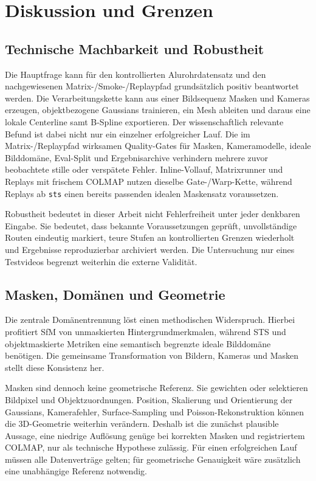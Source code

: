\section{Diskussion und Grenzen}

\subsection{Technische Machbarkeit und Robustheit}

Die Hauptfrage kann für den kontrollierten Alurohrdatensatz und den
nachgewiesenen Matrix-/Smoke-/Replaypfad grundsätzlich positiv beantwortet
werden. Die Verarbeitungskette kann aus einer Bildsequenz Masken und Kameras
erzeugen, objektbezogene Gaussians trainieren, ein Mesh ableiten und daraus
eine lokale Centerline samt B-Spline exportieren. Der wissenschaftlich
relevante Befund ist dabei nicht nur ein einzelner erfolgreicher Lauf. Die im
Matrix-/Replaypfad wirksamen Quality-Gates für Masken, Kameramodelle, ideale
Bilddomäne, Eval-Split und Ergebnisarchive verhindern mehrere zuvor
beobachtete stille oder verspätete Fehler. Inline-Vollauf, Matrixrunner und
Replays mit frischem COLMAP nutzen dieselbe Gate-/Warp-Kette, während
Replays ab \texttt{sts} einen bereits passenden idealen Maskensatz voraussetzen.

Robustheit bedeutet in dieser Arbeit nicht Fehlerfreiheit unter jeder
denkbaren Eingabe. Sie bedeutet, dass bekannte Voraussetzungen geprüft,
unvollständige Routen eindeutig markiert, teure Stufen an kontrollierten
Grenzen wiederholt und Ergebnisse reproduzierbar archiviert werden. Die
Untersuchung nur eines Testvideos begrenzt weiterhin die externe Validität.

\subsection{Masken, Domänen und Geometrie}

Die zentrale Domänentrennung löst einen methodischen Widerspruch. Hierbei profitiert SfM von unmaskierten Hintergrundmerkmalen, während STS und objektmaskierte
Metriken eine semantisch begrenzte ideale Bilddomäne benötigen. Die gemeinsame
Transformation von Bildern, Kameras und Masken stellt diese Konsistenz her.

Masken sind dennoch keine geometrische Referenz. Sie gewichten oder selektieren
Bildpixel und Objektzuordnungen. Position, Skalierung und Orientierung der
Gaussians, Kamerafehler, Surface-Sampling und Poisson-Rekonstruktion können die
3D-Geometrie weiterhin verändern. Deshalb ist die zunächst plausible Aussage,
eine niedrige Auflösung genüge bei korrekten Masken und registriertem COLMAP,
nur als technische Hypothese zulässig. Für einen erfolgreichen Lauf müssen alle
Datenverträge gelten; für geometrische Genauigkeit wäre zusätzlich eine
unabhängige Referenz notwendig.

